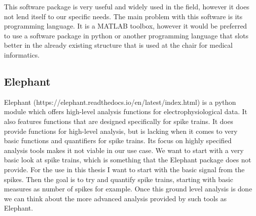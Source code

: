 This software package is very useful and widely used in the field, however it does not lend itself to our specific needs.
The main problem with this software is its programming language. It is a MATLAB toolbox, however it would be preferred to use a software package in python or another programming language that slots better in the already existing structure that is used at the chair for medical informatics.  

\subsection{Elephant}
Elephant (https://elephant.readthedocs.io/en/latest/index.html) is a python module which offers high-level analysis functions for electrophysiological data.
It also features functions that are designed specifically for spike trains. It does provide functions for high-level analysis, but is lacking when it comes to very basic functions and quantifiers for spike trains. 
Its focus on highly specified analysis tools makes it not viable in our use case. We want to start with a very basic look at spike trains, which is something that the Elephant package does not provide.
For the use in this thesis I want to start with the basic signal from the spikes. Then the goal is to try and quantify spike trains, starting with basic measures as number of spikes for example. Once this ground level analysis is done we can think about the more advanced analysis provided by such tools as Elephant.

